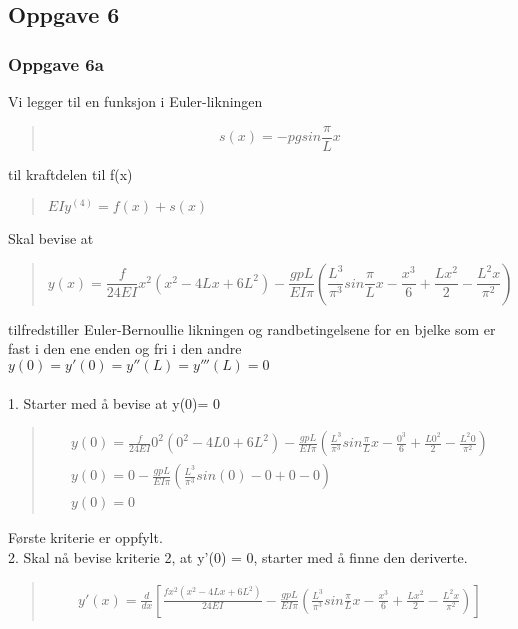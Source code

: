 \subsection{Oppgave 6}
\subsubsection{Oppgave 6a}
Vi legger til en funksjon i Euler-likningen
\begin{quote}
\begin{equation} \label{eq:sin(x)}
s(x) = -pgsin\frac{\pi}{L} x
\end{equation}
\end{quote} 
til kraftdelen til f(x)
\begin{quote}
$EIy^{(4)} = f(x) + s(x)$
\end{quote}
Skal bevise at
\begin{quote}
\begin{equation}\label{eq:oppgave6a}
y(x) = \frac{f}{24EI} x^2 (x^2 - 4Lx + 6L^2) - \frac{gpL}{EI\pi} (\frac{L^3}{\pi^3} sin\frac{\pi}{L}x - \frac{x^3}{6} + \frac{Lx^2}{2} - \frac{L^2 x}{\pi^2})
\end{equation}
\end{quote}
tilfredstiller Euler-Bernoullie likningen og randbetingelsene for en bjelke som er fast i den ene enden og fri i den andre\\
$y(0) = y'(0) = y''(L) = y'''(L) = 0$ \\
\\
1. Starter med å bevise at y(0)= 0
\begin{quote}
\begin{multline*}
y(0) = \frac{f}{24EI} 0^2 (0^2 - 4L0 + 6L^2) - \frac{gpL}{EI\pi} (\frac{L^3}{\pi^3} sin\frac{\pi}{L}x - \frac{0^3}{6} + \frac{L0^2}{2} - \frac{L^2 0}{\pi^2}) \\
y(0) = 0 - \frac{gpL}{EI\pi} (\frac{L^3}{\pi^3} sin (0) - 0 + 0 - 0 ) \\
y(0) = 0
\end{multline*}
\end{quote}
Første kriterie er oppfylt.
\\
2. Skal nå bevise kriterie 2, at y'(0) = 0, starter med å finne den deriverte.
\begin{quote}
\begin{multline}
y'(x) = \frac{d}{dx} [\frac{fx^2(x^2-4Lx+6L^2)}{24EI} - \frac{gpL}{EI\pi} (\frac{L^3}{\pi^3} sin \frac{\pi}{L}x - \frac{x^3}{6} + \frac{Lx^2}{2} - \frac{L^2x}{\pi^2})]
\end{multline}
\end{quote}

